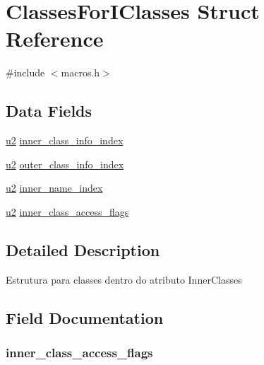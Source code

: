 \hypertarget{struct_classes_for_i_classes}{}\section{Classes\+For\+I\+Classes Struct Reference}
\label{struct_classes_for_i_classes}


{\ttfamily \#include $<$macros.\+h$>$}

\subsection*{Data Fields}
\begin{DoxyCompactItemize}
\item 
\hyperlink{macros_8h_a732cde1300aafb73b0ea6c2558a7a54f}{u2} \hyperlink{struct_classes_for_i_classes_a84a9a6c8c14f8900137a8f51b446d6c2}{inner\+\_\+class\+\_\+info\+\_\+index}
\item 
\hyperlink{macros_8h_a732cde1300aafb73b0ea6c2558a7a54f}{u2} \hyperlink{struct_classes_for_i_classes_a3b7a87f79f7ea8908d258f19b237bec2}{outer\+\_\+class\+\_\+info\+\_\+index}
\item 
\hyperlink{macros_8h_a732cde1300aafb73b0ea6c2558a7a54f}{u2} \hyperlink{struct_classes_for_i_classes_ac792b66aa74db5d300bf22502fb49ef1}{inner\+\_\+name\+\_\+index}
\item 
\hyperlink{macros_8h_a732cde1300aafb73b0ea6c2558a7a54f}{u2} \hyperlink{struct_classes_for_i_classes_ac48b6a5142c6e2ddcd51d41ab733eb15}{inner\+\_\+class\+\_\+access\+\_\+flags}
\end{DoxyCompactItemize}


\subsection{Detailed Description}
Estrutura para classes dentro do atributo Inner\+Classes 

\subsection{Field Documentation}
\hypertarget{struct_classes_for_i_classes_ac48b6a5142c6e2ddcd51d41ab733eb15}{}
\subsubsection[{inner\+\_\+class\+\_\+access\+\_\+flags}]{ inner\+\_\+class\+\_\+access\+\_\+flags}\label{struct_classes_for_i_classes_ac48b6a5142c6e2ddcd51d41ab733eb15}
\hypertarget{struct_classes_for_i_classes_a84a9a6c8c14f8900137a8f51b446d6c2}{}
